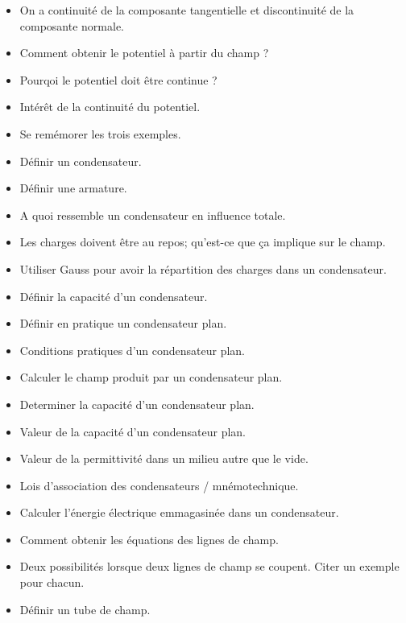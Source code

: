 \documentclass[a4paper, 11pt, hidelinks]{article}
\begin{document}
\begin{itemize}
    \item On a continuité de la composante tangentielle et discontinuité de la composante normale. \cite{Chapitre9}
    \item Comment obtenir le potentiel à partir du champ ? \cite{Chapitre9}
    \item Pourqoi le potentiel doit être continue ? \cite{Chapitre9}
    \item Intérêt de la continuité du potentiel. \cite{Chapitre9}
    \item Se remémorer les trois exemples. \cite{Chapitre9}
    \item Définir un condensateur. \cite{Chapitre9}
    \item Définir une armature. \cite{Chapitre9}
    \item A quoi ressemble un condensateur en influence totale. \cite{Chapitre9}
    \item Les charges doivent être au repos; qu'est-ce que ça implique sur le champ. \cite{Chapitre9}
    \item Utiliser Gauss pour avoir la répartition des charges dans un condensateur. \cite{Chapitre9}
    \item Définir la capacité d'un condensateur. \cite{Chapitre9}
    \item Définir en pratique un condensateur plan. \cite{Chapitre9}
    \item Conditions pratiques d'un condensateur plan. \cite{Chapitre9}
    \item Calculer le champ produit par un condensateur plan. \cite{Chapitre9}
    \item Determiner la capacité d'un condensateur plan. \cite{Chapitre9}
    \item Valeur de la capacité d'un condensateur plan. \cite{Chapitre9}
    \item Valeur de la permittivité dans un milieu autre que le vide. \cite{Chapitre9}
    \item Lois d'association des condensateurs / mnémotechnique. \cite{Chapitre9}
    \item Calculer l'énergie électrique emmagasinée dans un condensateur. \cite{Chapitre9}
    \item Comment obtenir les équations des lignes de champ. \cite{Chapitre9}
    \item Deux possibilités lorsque deux lignes de champ se coupent. Citer un exemple pour chacun. \cite{Chapitre9}
    \item Définir un tube de champ. \cite{Chapitre9}

\end{itemize}
\end{document}
